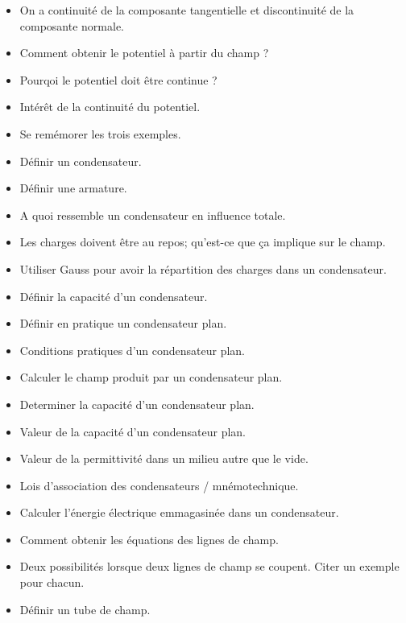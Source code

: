 \documentclass[a4paper, 11pt, hidelinks]{article}
\begin{document}
\begin{itemize}
    \item On a continuité de la composante tangentielle et discontinuité de la composante normale. \cite{Chapitre9}
    \item Comment obtenir le potentiel à partir du champ ? \cite{Chapitre9}
    \item Pourqoi le potentiel doit être continue ? \cite{Chapitre9}
    \item Intérêt de la continuité du potentiel. \cite{Chapitre9}
    \item Se remémorer les trois exemples. \cite{Chapitre9}
    \item Définir un condensateur. \cite{Chapitre9}
    \item Définir une armature. \cite{Chapitre9}
    \item A quoi ressemble un condensateur en influence totale. \cite{Chapitre9}
    \item Les charges doivent être au repos; qu'est-ce que ça implique sur le champ. \cite{Chapitre9}
    \item Utiliser Gauss pour avoir la répartition des charges dans un condensateur. \cite{Chapitre9}
    \item Définir la capacité d'un condensateur. \cite{Chapitre9}
    \item Définir en pratique un condensateur plan. \cite{Chapitre9}
    \item Conditions pratiques d'un condensateur plan. \cite{Chapitre9}
    \item Calculer le champ produit par un condensateur plan. \cite{Chapitre9}
    \item Determiner la capacité d'un condensateur plan. \cite{Chapitre9}
    \item Valeur de la capacité d'un condensateur plan. \cite{Chapitre9}
    \item Valeur de la permittivité dans un milieu autre que le vide. \cite{Chapitre9}
    \item Lois d'association des condensateurs / mnémotechnique. \cite{Chapitre9}
    \item Calculer l'énergie électrique emmagasinée dans un condensateur. \cite{Chapitre9}
    \item Comment obtenir les équations des lignes de champ. \cite{Chapitre9}
    \item Deux possibilités lorsque deux lignes de champ se coupent. Citer un exemple pour chacun. \cite{Chapitre9}
    \item Définir un tube de champ. \cite{Chapitre9}

\end{itemize}
\end{document}
